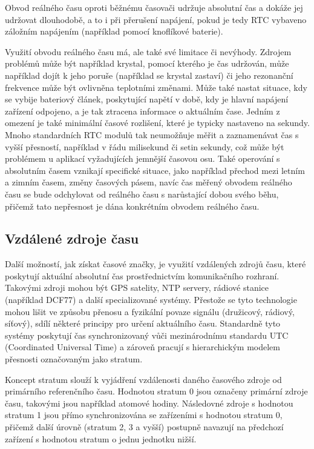 Obvod reálného času oproti běžnému časovači udržuje absolutní čas a dokáže jej udržovat dlouhodobě, a to i při přerušení napájení, pokud je tedy RTC vybaveno záložním napájením (například pomocí knoflíkové baterie).

Využití obvodu reálného času má, ale také své limitace či nevýhody. Zdrojem problémů může být například krystal, pomocí kterého je čas udržován, může například dojít k jeho poruše (například se krystal zastaví) či jeho rezonanční frekvence může být ovlivněna teplotními změnami. Může také nastat situace, kdy se vybije bateriový článek, poskytující napětí v době, kdy je hlavní napájení zařízení odpojeno, a je tak ztracena informace o aktuálním čase. Jedním z omezení je také minimální časové rozlišení, které je typicky nastaveno na sekundy. Mnoho standardních RTC modulů tak neumožňuje měřit a zaznamenávat čas s vyšší přesností, například v řádu milisekund či setin sekundy, což může být problémem u aplikací vyžadujících jemnější časovou osu. Také operování s absolutním časem vznikají specifické situace, jako například přechod mezi letním a zimním časem, změny časových pásem, navíc čas měřený obvodem reálného času se bude odchylovat od reálného času s narůstající dobou svého běhu, přičemž tato nepřesnost je dána konkrétním obvodem reálného času. \cite{jameco_choosing_right_real_time_clock_chip_or_module, embed_journal_interfacing_rtc_with_microcontroler, medium_rtc}

\subsection{Vzdálené zdroje času}
Další možností, jak získat časové značky, je využití vzdálených zdrojů času, které poskytují aktuální absolutní čas prostřednictvím komunikačního rozhraní. Takovými zdroji mohou být GPS satelity, NTP servery, rádiové stanice (například DCF77) a další specializované systémy. Přestože se tyto technologie mohou lišit ve způsobu přenosu a fyzikální povaze signálu (družicový, rádiový, síťový), sdílí některé principy pro určení aktuálního času. Standardně tyto systémy poskytují čas synchronizovaný vůči mezinárodnímu standardu UTC (Coordinated Universal Time) a zároveň pracují s hierarchickým modelem přesnosti označovaným jako stratum.

Koncept stratum slouží k vyjádření vzdálenosti daného časového zdroje od primárního referenčního času. Hodnotou stratum 0 jsou označeny primární zdroje času, takovými jsou například atomové hodiny. Následovné zdroje s hodnotou stratum 1 jsou přímo synchronizována se zařízeními s hodnotou stratum 0, přičemž další úrovně (stratum 2, 3 a vyšší) postupně navazují na předchozí zařízení s hodnotou stratum o jednu jednotku nižší.


